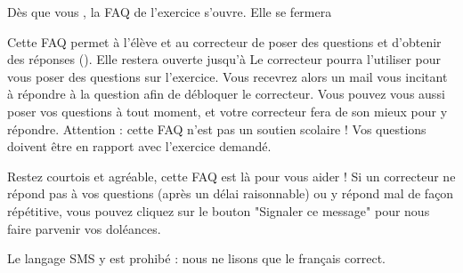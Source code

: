 ﻿Dès que vous , la FAQ de l'exercice s'ouvre. Elle se fermera %

Cette FAQ permet à l'élève et au correcteur de poser des questions et d'obtenir des réponses ().
Elle restera ouverte jusqu'à %
Le correcteur pourra l'utiliser pour vous poser des questions sur l'exercice. Vous recevrez alors un mail vous incitant à répondre à la question afin de débloquer le correcteur.
Vous pouvez vous aussi poser vos questions à tout moment, et votre correcteur fera de son mieux pour y répondre.
Attention : cette FAQ n'est pas un soutien scolaire ! Vos questions doivent être en rapport avec l'exercice demandé.

Restez courtois et agréable, cette FAQ est là pour vous aider !
Si un correcteur ne répond pas à vos questions (après un délai raisonnable) ou y répond mal de façon répétitive, vous pouvez cliquez sur le bouton "Signaler ce message" pour nous faire parvenir vos doléances.

Le langage SMS y est prohibé : nous ne lisons que le français correct.